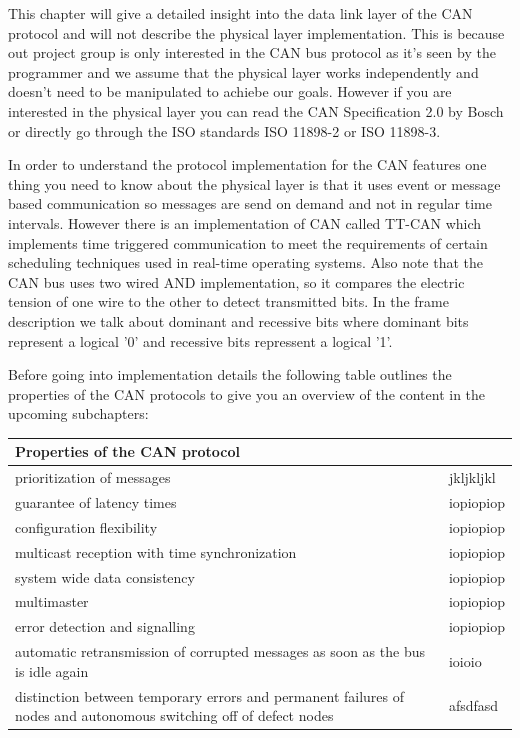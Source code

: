 This chapter will give a detailed insight into the data link layer of the CAN
protocol and will not describe the physical layer implementation. This is
because out project group is only interested in the CAN bus protocol as it's
seen by the programmer and we assume that the physical layer works independently
and doesn't need to be manipulated to achiebe our goals. However if you are
interested in the physical layer you can read the CAN Specification
2.0\cite{can2spec} by Bosch or directly go through the ISO standards ISO 11898-2\cite{iso11898-2} or ISO
11898-3\cite{iso11898-3}.

In order to understand the protocol implementation for the CAN features one
thing you need to know about the physical layer is that it uses event or message
based communication so messages are send on demand and not in regular time
intervals. However there is an implementation of CAN called
TT-CAN\cite{iso11898-4} which implements time triggered communication to meet
the requirements of certain scheduling techniques used in real-time operating systems.
Also note that the CAN bus uses two wired AND implementation, so it compares
the electric tension of one wire to the other to detect transmitted bits. In the
frame description we talk about dominant and recessive bits where dominant bits
represent a logical '0' and recessive bits repressent a logical '1'.

Before going into implementation details the following table outlines the
properties of the CAN protocols to give you an overview of the content in the
upcoming subchapters:

\begin{center}
    \begin{tabular}{ | l | p{5.5cm} |}
    \hline
    \rowcolor{lightgray} Properties of the CAN protocol \\ \hline
    prioritization of messages & jkljkljkl \\ \hline
    guarantee of latency times & iopiopiop \\ \hline
    configuration flexibility & iopiopiop \\ \hline
    multicast reception with time synchronization & iopiopiop \\ \hline
    system wide data consistency & iopiopiop \\ \hline
    multimaster & iopiopiop \\ \hline
    error detection and signalling & iopiopiop \\ \hline
    automatic retransmission of corrupted messages as soon as the bus is idle
    again & ioioio \\ \hline 
    distinction between temporary errors and permanent
    failures of nodes and autonomous switching off of defect nodes & afsdfasd \\
    \hline
    \end{tabular}
\end{center}

